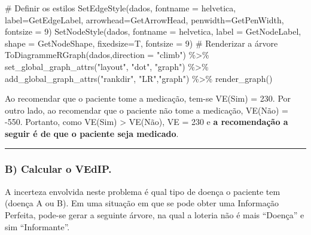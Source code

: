 \documentclass[
  letterpaper,
  DIV=11,
  numbers=noendperiod]{scrartcl}
\newenvironment{Shaded}{\begin{snugshade}}{\end{snugshade}}
\newcommand{\AttributeTok}[1]{\textcolor[rgb]{0.40,0.45,0.13}{#1}}
\newcommand{\CommentTok}[1]{\textcolor[rgb]{0.37,0.37,0.37}{#1}}
\newcommand{\DecValTok}[1]{\textcolor[rgb]{0.68,0.00,0.00}{#1}}
\newcommand{\FunctionTok}[1]{\textcolor[rgb]{0.28,0.35,0.67}{#1}}
\newcommand{\NormalTok}[1]{\textcolor[rgb]{0.00,0.23,0.31}{#1}}
\newcommand{\SpecialCharTok}[1]{\textcolor[rgb]{0.37,0.37,0.37}{#1}}
\newcommand{\StringTok}[1]{\textcolor[rgb]{0.13,0.47,0.30}{#1}}
\begin{document}
\begin{Shaded}
\begin{Highlighting}[]
\CommentTok{\# Definir os estilos}
\FunctionTok{SetEdgeStyle}\NormalTok{(dados, }\AttributeTok{fontname =} \StringTok{\textquotesingle{}helvetica\textquotesingle{}}\NormalTok{, }\AttributeTok{label=}\NormalTok{GetEdgeLabel, }\AttributeTok{arrowhead=}\NormalTok{GetArrowHead, }\AttributeTok{penwidth=}\NormalTok{GetPenWidth, }\AttributeTok{fontsize =} \DecValTok{9}\NormalTok{)}
\FunctionTok{SetNodeStyle}\NormalTok{(dados, }\AttributeTok{fontname =} \StringTok{\textquotesingle{}helvetica\textquotesingle{}}\NormalTok{, }\AttributeTok{label =}\NormalTok{ GetNodeLabel, }\AttributeTok{shape =}\NormalTok{ GetNodeShape, }\AttributeTok{fixedsize=}\NormalTok{T, }\AttributeTok{fontsize =} \DecValTok{9}\NormalTok{)}
\CommentTok{\# Renderizar a árvore}
\FunctionTok{ToDiagrammeRGraph}\NormalTok{(dados,}\AttributeTok{direction =} \StringTok{"climb"}\NormalTok{) }\SpecialCharTok{\%\textgreater{}\%}
  \FunctionTok{set\_global\_graph\_attrs}\NormalTok{(}\StringTok{"layout"}\NormalTok{, }\StringTok{"dot"}\NormalTok{, }\StringTok{"graph"}\NormalTok{) }\SpecialCharTok{\%\textgreater{}\%}
  \FunctionTok{add\_global\_graph\_attrs}\NormalTok{(}\StringTok{"rankdir"}\NormalTok{, }\StringTok{"LR"}\NormalTok{,}\StringTok{"graph"}\NormalTok{) }\SpecialCharTok{\%\textgreater{}\%}
  \FunctionTok{render\_graph}\NormalTok{()}
\end{Highlighting}
\end{Shaded}

Ao recomendar que o paciente tome a medicação, tem-se VE(Sim) = 230. Por
outro lado, ao recomendar que o paciente não tome a medicação, VE(Não) =
-550. Portanto, como VE(Sim) \textgreater{} VE(Não), VE = 230 e
\textbf{a recomendação a seguir é de que o paciente seja medicado}.

\begin{center}\rule{0.5\linewidth}{0.5pt}\end{center}

\hypertarget{b-calcular-o-vedip.}{%
\subsubsection{B) Calcular o VEdIP.}\label{b-calcular-o-vedip.}}

A incerteza envolvida neste problema é qual tipo de doença o paciente
tem (doença A ou B). Em uma situação em que se pode obter uma Informação
Perfeita, pode-se gerar a seguinte árvore, na qual a loteria não é mais
``Doença'' e sim ``Informante''.
\end{document}
